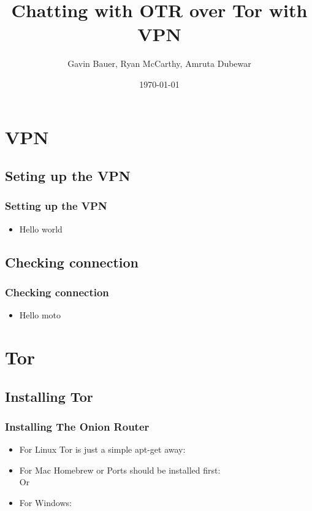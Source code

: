 \documentclass{beamer}
\title{Chatting with OTR over Tor with VPN}
\author{Gavin Bauer, Ryan McCarthy, Amruta Dubewar}
\date{\today}
\begin{document}
\begin{frame}
\maketitle
\end{frame}
\section{VPN}
\subsection{Seting up the VPN}
\begin{frame}
\frametitle{Setting up the VPN}
\begin{itemize}
\item Hello world
\end{itemize}
\end{frame}
\subsection{Checking connection}
\begin{frame}
\frametitle{Checking connection}
\begin{itemize}
\item Hello moto
\end{itemize}
\end{frame}


\section{Tor}
\subsection{Installing Tor}
\begin{frame}
\frametitle{Installing The Onion Router}
\begin{itemize}
\item For Linux Tor is just a simple apt-get away:\\
\pause
{\color{blue}{sudo apt-get install tor}}
\pause
\item For Mac Homebrew or Ports should be installed first:\\
\pause{\color{blue}{brew install tor}} Or {\color{blue}{ports install tor}}
\pause
\item For Windows:
\pause
{\color{red}{You're on your own...}}

\end{itemize}
\end{frame}
\end{document}
